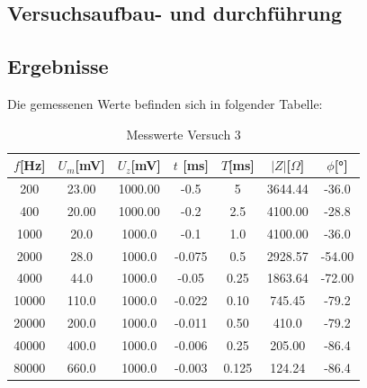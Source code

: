     \subsection{Versuchsaufbau- und durchführung}

    \subsection{Ergebnisse}
    
    Die gemessenen Werte befinden sich in folgender Tabelle:

    \begin{table}[H]
        \centering
        \caption{Messwerte Versuch 3}
        \vspace{0.5em}
        \begin{tabular}{|c||c|c|c|c|c|c|}
            \hline
            $f$[Hz] & $U_m$[mV]  & $U_z$[mV] & $t$ [ms] & $T$[ms] & $|Z|$[$\Omega$] & $\phi$[°] \\
            \hline
            200 & 23.00& 1000.00& -0.5 & 5& 3644.44& -36.0 \\
            \hline
            400 & 20.00 & 1000.00 & -0.2 & 2.5 & 4100.00 & -28.8 \\
            \hline
            1000 & 20.0 & 1000.0 & -0.1 & 1.0 & 4100.00 & -36.0 \\
            \hline
            2000 & 28.0 & 1000.0 & -0.075 & 0.5 & 2928.57 & -54.00  \\
            \hline
            4000 & 44.0 & 1000.0 &  -0.05 & 0.25 & 1863.64 &  -72.00\\
            \hline
            10000 & 110.0 & 1000.0 & -0.022 & 0.10 & 745.45 & -79.2 \\
            \hline
            20000 & 200.0 & 1000.0& -0.011 & 0.50&410.0 & -79.2\\
            \hline
            40000 & 400.0 &1000.0 & -0.006 & 0.25 & 205.00 & -86.4 \\
            \hline
            80000 & 660.0 &1000.0 & -0.003 & 0.125 & 124.24 &  -86.4\\
            \hline
        \end{tabular}
        \label{tab:Versuch3_Messwerte}
\end{table}

